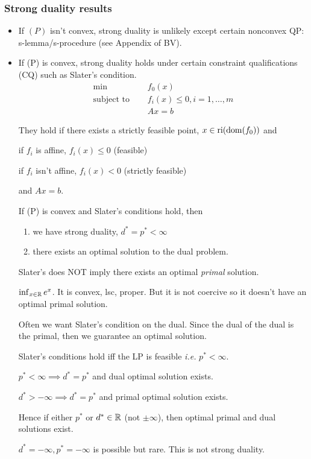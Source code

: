 \documentclass[class=article,crop=false]{standalone}
\begin{document}
\subsubsection{Strong duality results}
\begin{itemize}
	\item If $ (P)$ isn't convex, strong duality is unlikely except certain nonconvex QP: s-lemma/s-procedure (see Appendix of BV).
	\item  If (P) is convex, strong duality holds under certain constraint qualifications (CQ) such as Slater's condition.
		\begin{align*}
		\min\quad &f_0(x) \\
		\text{subject to } \quad &f_i(x) \leq 0, i = 1,\ldots,m \\
		&Ax = b
		\end{align*}
		\begin{defn}
			They hold if there exists a strictly feasible point, $ x \in \operatorname{ri}(\operatorname{dom}(f_0))$ and

			if $ f_i$ is affine, $ f_i(x)\leq 0$ (feasible)

			if $ f_i$ isn't affine, $ f_i(x)<0$ (strictly feasible)

			and $ Ax=b$.
		\end{defn}
		\begin{thm}
			If (P) is convex and Slater's conditions hold, then
			\begin{enumerate}[label=(\roman*)]
				\item we have strong duality, $ d^* =p^* <\infty$
				\item there exists an optimal solution to the dual problem.
			\end{enumerate}
		\end{thm}
		\begin{note}
			Slater's does NOT imply there exists an optimal \emph{primal} solution.
		\begin{eg}
		$ \inf_{x \in \mathbb{R}} e^{x}$. It is convex, lsc, proper. But it is not coercive so it doesn't have an optimal primal solution.
		\end{eg}
		\end{note}
		\begin{remark}
		Often we want Slater's condition on the dual. Since the dual of the dual is the primal, then we guarantee an optimal solution.
		\end{remark}
		\begin{coro}
		Slater's conditions hold iff the LP is feasible \emph{i.e.} $ p^* < \infty$.

		$ p^* < \infty \implies d^* =p^* $ and dual optimal solution exists.

		$ d^* >- \infty \implies d^* =p^* $ and primal optimal solution exists.

		Hence if either $ p^* $ or $ d^* \in \mathbb{R}$ (not $ \pm \infty$), then optimal primal and dual solutions exist.
		\end{coro}
		\begin{note}
		$ d^* = - \infty, p^* = -\infty$ is possible but rare. This is not strong duality.
		\end{note}
\end{itemize}
\end{document}
